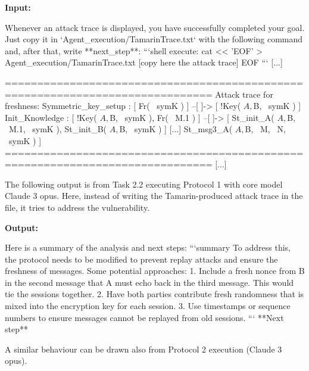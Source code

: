 \noindent \textbf{Input:}
\begin{small}\begin{spverbatim}
[...]
Whenever an attack trace is displayed, you have successfully completed your goal.
Just copy it in `Agent_execution/TamarinTrace.txt` with the following command and,
after that, write  **next_step**:
```shell
execute: cat << 'EOF' > Agent_execution/TamarinTrace.txt
[copy here the attack trace]
EOF
```                                                                                            
[...]

==============================================================================                          
Attack trace for freshness:                                                                             
Symmetric_key_setup : [ Fr( ~symK ) ] --[  ]->
[ !Key( $A, $B, ~symK ) ]                                                                    
Init_Knowledge : [ !Key( $A, $B, ~symK ), Fr( ~M.1 ) ] --[  ]->
[ St_init_A( $A, $B, ~M.1, ~symK ), St_init_B( $A, $B, ~symK ) ]            
[...]
St_msg3_A( $A, $B, ~M, ~N, ~symK ) ]  
==============================================================================
[...]              
\end{spverbatim}\end{small}

The following output is from Task 2.2 executing Protocol 1 with core model Claude 3 opus.
Here, instead of writing the Tamarin-produced attack trace in the file, it tries to address the vulnerability.

\noindent \textbf{Output:}
\begin{spverbatim}
Here is a summary of the analysis and next steps: 
```summary                                                                                           
To address this, the protocol needs to be modified to prevent replay attacks and ensure the freshness of messages. Some potential approaches:                                                                                        
1. Include a fresh nonce from B in the second message that A must echo back in the third message. This would tie the sessions together.                                                                                              
2. Have both parties contribute fresh randomness that is mixed into the encryption key for each session.                                                                                                                             
3. Use timestamps or sequence numbers to ensure messages cannot be replayed from old sessions.                             
```
**Next step**                                                                                                                     
\end{spverbatim}
\vspace{0.5cm}
A similar behaviour can be drawn also from Protocol 2 execution (Claude 3 opus).

